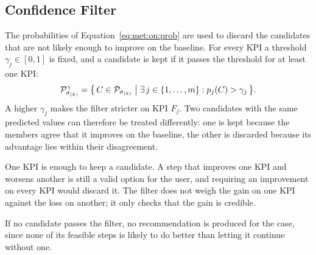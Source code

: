 
\subsection{Confidence Filter}
\label{subsec:met:online:filter}
The probabilities of Equation~\eqref{eq:met:on:prob} are used to discard
the candidates that are not likely enough to improve on the baseline. For
every KPI a threshold $\gamma_j \in [0, 1]$ is fixed, and a candidate is
kept if it passes the threshold for at least one KPI:
\begin{equation}
  \mathcal{P}^{\gamma}_{\sigma_{(k)}} = \bigl\{\, C \in
  \mathcal{P}_{\sigma_{(k)}} \bigm| \exists\, j \in \{1, \dots, m\} :
  p_j(C) > \gamma_j \,\bigr\}.
  \label{eq:met:on:filter}
\end{equation}
A higher $\gamma_j$ makes the filter stricter on KPI $F_j$. Two candidates
with the same predicted values can therefore be treated differently: one is
kept because the members agree that it improves on the baseline, the other
is discarded because its advantage lies within their disagreement.

One KPI is enough to keep a candidate. A step that improves one KPI and
worsens another is still a valid option for the user, and requiring an
improvement on every KPI would discard it. The filter does not weigh the
gain on one KPI against the loss on another; it only checks that the gain is
credible.

If no candidate passes the filter, no recommendation is produced for the
case, since none of its feasible steps is likely to do better than letting
it continue without one.

